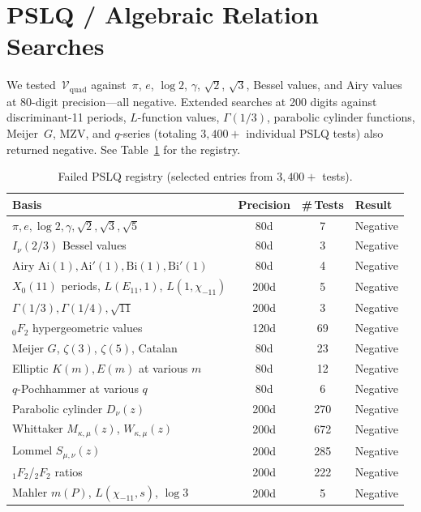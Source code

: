 \documentclass[11pt,a4paper]{article}
\begin{document}
\section{PSLQ / Algebraic Relation Searches}\label{sec:pslq}

We tested~$\mathcal{V}_{\mathrm{quad}}$ against~$\pi$, $e$, $\log 2$, $\gamma$, $\sqrt{2}$, $\sqrt{3}$, Bessel values, and Airy values at 80-digit precision---all negative. Extended searches at 200 digits against discriminant-11 periods, $L$-function values, $\Gamma(1/3)$, parabolic cylinder functions, Meijer~$G$, MZV, and $q$-series (totaling $3{,}400{+}$ individual PSLQ tests) also returned negative. See Table~\ref{tab:pslq} for the registry.

\begin{table}[ht]
\centering
\caption{Failed PSLQ registry (selected entries from $3{,}400{+}$ tests).}
\label{tab:pslq}
\begin{tabular}{@{}lccl@{}}
\toprule
Basis & Precision & \#\,Tests & Result \\
\midrule
$\pi, e, \log 2, \gamma, \sqrt{2}, \sqrt{3}, \sqrt{5}$ & 80d & 7 & Negative \\
$I_{\nu}(2/3)$ Bessel values & 80d & 3 & Negative \\
Airy $\mathrm{Ai}(1), \mathrm{Ai}'(1), \mathrm{Bi}(1), \mathrm{Bi}'(1)$ & 80d & 4 & Negative \\
$X_0(11)$ periods, $L(E_{11},1)$, $L(1,\chi_{-11})$ & 200d & 5 & Negative \\
$\Gamma(1/3), \Gamma(1/4), \sqrt{11}$ & 200d & 3 & Negative \\
${}_0F_2$ hypergeometric values & 120d & 69 & Negative \\
Meijer $G$, $\zeta(3)$, $\zeta(5)$, Catalan & 80d & 23 & Negative \\
Elliptic $K(m), E(m)$ at various $m$ & 80d & 12 & Negative \\
$q$-Pochhammer at various $q$ & 80d & 6 & Negative \\
Parabolic cylinder $D_\nu(z)$ & 200d & 270 & Negative \\
Whittaker $M_{\kappa,\mu}(z)$, $W_{\kappa,\mu}(z)$ & 200d & 672 & Negative \\
Lommel $S_{\mu,\nu}(z)$ & 200d & 285 & Negative \\
${}_1F_2$/${}_2F_2$ ratios & 200d & 222 & Negative \\
Mahler $m(P)$, $L(\chi_{-11},s)$, $\log 3$ & 200d & 5 & Negative \\
\bottomrule
\end{tabular}
\end{table}
\end{document}
